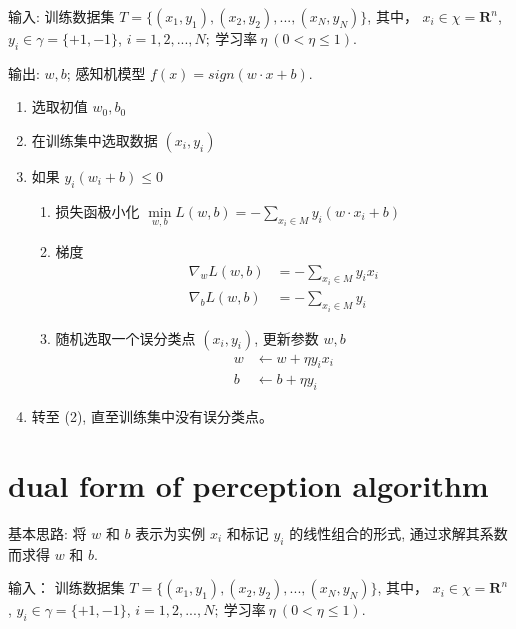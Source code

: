 \documentclass[oneside, 12pt]{ctexbook}
\begin{document}
			输入: 训练数据集 $T = \{ (x_1, y_1), (x_2, y_2), ..., (x_N, y_N)\}$,
			其中， $x_i \in \chi = \boldsymbol{\text{R}}^n$, $y_i \in \gamma = \{ +1, -1\}$, $ i = 1,2,...,N; \ \text{学习率} \ \eta \ (0 < \eta \leq 1)$.
			
			输出: $w, b$; 感知机模型 $f(x) = sign(w \cdot x + b)$.
				\begin{enumerate}
					\item 选取初值 $w_0, b_0$
					
					\item 在训练集中选取数据 $(x_i, y_i)$
					
					\item 如果 $y_i (w_i + b) \leq 0$
						\begin{enumerate}
							\item 损失函极小化 $\underset{w,b}{\min}L(w, b) = -\sum\limits_{x_i \in M} y_i (w \cdot x_i + b)$
							
							\item 梯度
								\begin{align}
									\nabla_w L(w, b) &= -\sum_{x_i \in M} y_i x_i \\
									\nabla_b L(w, b) &= -\sum_{x_i \in M} y_i
								\end{align}
								
							\item 随机选取一个误分类点 $(x_i, y_i)$, 更新参数 $w, b$
								\begin{align}
									w &\leftarrow w + \eta y_i x_i \\
									b &\leftarrow b + \eta y_i
								\end{align}
						\end{enumerate}
					
					\item 转至 (2), 直至训练集中没有误分类点。
			\end{enumerate}
			
		\section{\quad dual form of perception algorithm}
			基本思路: 将 $w$ 和 $b$ 表示为实例 $x_i$ 和标记 $y_i$ 的线性组合的形式, 通过求解其系数而求得 $w$ 和 $b$. 
			
			输入： 训练数据集 $T = \{ (x_1, y_1), (x_2, y_2), ..., (x_N, y_N)\}$,
			其中， $x_i \in \chi = \boldsymbol{\text{R}}^n$, $y_i \in \gamma = \{ +1, -1\}$, $ i = 1,2,...,N; \ \text{学习率} \ \eta \ (0 < \eta \leq 1)$.
			
\end{document}
